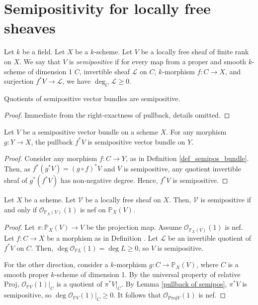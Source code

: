 \section{Semipositivity for locally free sheaves}

\begin{definition}\label{def_semipos_bundle}
Let $k$ be a field.
Let $X$ be a $k$-scheme.
Let $V$ be a locally free sheaf of finite rank on $X$.
We say that $V$ is \textit{semipositive} if for every map from a proper and smooth $k$-scheme of dimension 1 $C$, invertible sheaf $\mathcal{L}$ on $C$, $k$-morphism $f:C\to X$, and surjection $f^{*}V\to\mathcal{L}$, we have $\deg_C\mathcal{L}\ge0$.\end{definition}


\begin{lemma}
Quotients of semipositive vector bundles are semipositive.
\end{lemma}

\begin{proof}
Immediate from the right-exactness of pullback, details omitted.
\end{proof}


\begin{lemma}\label{pullback of semipos}
Let $V$ be a semipositive vector bundle on a scheme $X$. For any morphism $g:Y\to X$, the pullback $f^*V$ is semipositive vector bundle on $Y$.
\end{lemma}
\begin{proof}
Consider any morphism $f:C\to Y$, as in Definition \ref{def_semipos_bundle}. 
Then, as $f^*(g^*V)=(g\circ f)^*V$ and $V$ is semipositive, any quotient invertible sheaf of $g^*(f^*V)$ has non-negative degree. 
Hence, $f^*V$ is semipositive.
\end{proof}

\begin{lemma}\label{semipos=nef}
Let $X$ be a scheme.
Let $\mathcal{V}$ be a locally free sheaf on $X$.
Then, $\mathcal{V}$ is semipositive if and only if $\mathcal{O}_{\mathbb{P}_X(V)}(1)$ is nef on $\mathbb{P}_X(V)$.
\end{lemma}

\begin{proof}
Let $\pi:\mathbb{P}_X(V)\to V$ be the projection map. 
Assume $\mathcal{O}_{\mathbb{P}_X(V)}(1)$ is nef.
Let $f:C\to X$ be a morphism as in Definition \label{def_semipos_bundle}.
Let $\mathcal{L}$ be an invertible quotient of $f^*V$ on $C$. 
Then, $\deg \mathcal{O}_{\mathbb{P}L}(1)=\deg L\ge0$, so $V$ is semipositive.

For the other direction, consider a $k$-morphism $g:C\to\mathbb{P}_X(V)$, where $C$ is a smooth proper $k$-scheme of dimension 1.
By the universal property of relative Proj, $\mathcal{O}_{\mathbb{P}V}(1)|_C$ is a quotient of $\pi^*V|_C$. 
By Lemma \ref{pullback of semipos}, $\pi^*V$ is semipositive, so $\deg\mathcal{O}_{\mathbb{P}V}(1)|_C\geq 0$.
It follows that $\mathcal{O}_{\mathrm{Proj} V}(1)$ is nef.
\end{proof}



